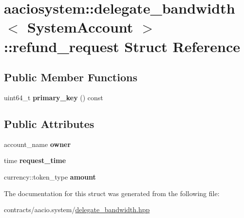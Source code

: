 \hypertarget{structaaciosystem_1_1delegate__bandwidth_1_1refund__request}{}\section{aaciosystem\+:\+:delegate\+\_\+bandwidth$<$ System\+Account $>$\+:\+:refund\+\_\+request Struct Reference}
\label{structaaciosystem_1_1delegate__bandwidth_1_1refund__request}
\subsection*{Public Member Functions}
\begin{DoxyCompactItemize}
\item 
\mbox{\label{structaaciosystem_1_1delegate__bandwidth_1_1refund__request_a2a0b3769dc575f2b9ecdcab5699f1008}} 
uint64\+\_\+t {\bfseries primary\+\_\+key} () const
\end{DoxyCompactItemize}
\subsection*{Public Attributes}
\begin{DoxyCompactItemize}
\item 
\mbox{\label{structaaciosystem_1_1delegate__bandwidth_1_1refund__request_a57e71558d899941bb16734589e1cd474}} 
account\+\_\+name {\bfseries owner}
\item 
\mbox{\label{structaaciosystem_1_1delegate__bandwidth_1_1refund__request_a16c4eafac6557f9bd61a845a8c7d943f}} 
time {\bfseries request\+\_\+time}
\item 
\mbox{\label{structaaciosystem_1_1delegate__bandwidth_1_1refund__request_ad46b8d714cd35a37c4d166c15714a334}} 
currency\+::token\+\_\+type {\bfseries amount}
\end{DoxyCompactItemize}


The documentation for this struct was generated from the following file\+:\begin{DoxyCompactItemize}
\item 
contracts/aacio.\+system/\mbox{\hyperlink{delegate__bandwidth_8hpp}{delegate\+\_\+bandwidth.\+hpp}}\end{DoxyCompactItemize}
